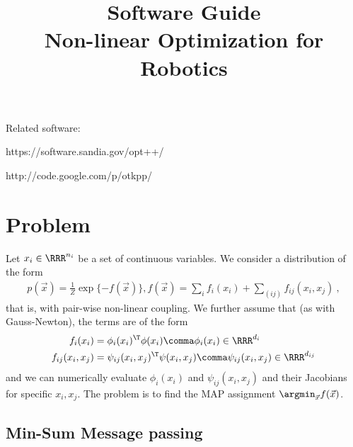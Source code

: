 
\renewcommand{\algorithmiccomment}[1]{\qquad{// #1}}

\newcommand{\xT}{\underline{x}}

\title{Software Guide\\Non-linear Optimization for Robotics}


\maketitle

Related software:

https://software.sandia.gov/opt++/

http://code.google.com/p/otkpp/


\section{Problem}

Let $x_i \in\RRR^{n_i}$ be a set of continuous variables. We consider
a distribution of the form
\begin{align}
p(\vec x) = \frac{1}{Z} \exp\{-f(\vec x)\} \comma
f(\vec x) = \sum_i f_i(x_i) + \sum_{(ij)} f_{ij}(x_i,x_j) ~,
\end{align}
that is, with pair-wise non-linear coupling. We further assume that
(as with Gauss-Newton), the terms are of the form
\begin{align}
f_i(x_i) &= \phi_i(x_i)^\T \phi(x_i) \comma \phi_i(x_i) \in \RRR^{d_i} \\
f_{ij}(x_i,x_j) &= \psi_{ij}(x_i,x_j)^\T \psi(x_i,x_j) \comma
\psi_{ij}(x_i,x_j) \in \RRR^{d_{ij}}
\end{align}
and we can numerically evaluate $\phi_i(x_i)$ and $\psi_{ij}(x_i,x_j)$
and their Jacobians for specific $x_i,x_j$. The problem is to find the
MAP assignment $\argmin_{\vec x} f(\vec x)$.

\subsection{Min-Sum Message passing}

